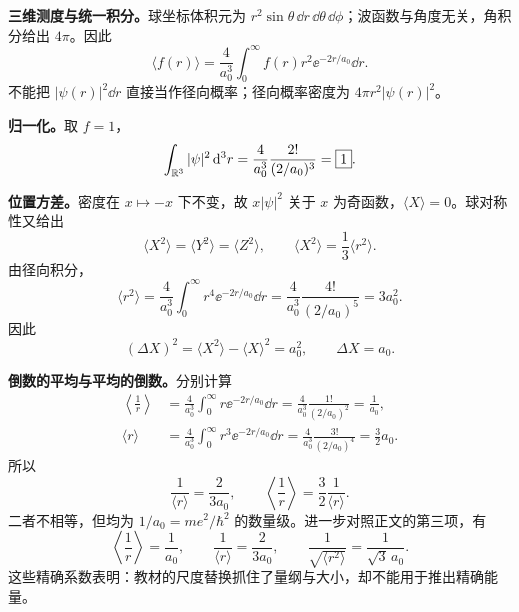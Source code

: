 \begin{checkedsolution}
\textbf{三维测度与统一积分。}球坐标体积元为 $r^2\sin\theta\,\dd r\,\dd\theta\,\dd\phi$；波函数与角度无关，角积分给出 $4\pi$。因此
\begin{equation}
  \langle f(r)\rangle=\frac4{a_0^3}\int_0^\infty
      f(r)r^2\ee^{-2r/a_0}\dd r.
\end{equation}
不能把 $|\psi(r)|^2\dd r$ 直接当作径向概率；径向概率密度为 $4\pi r^2|\psi(r)|^2$。

\textbf{归一化。}取 $f=1$，
\begin{equation}
  \int_{\mathbb{R}^3}|\psi|^2\mathop{}\!\mathrm{d}^3r
   =\frac4{a_0^3}\frac{2!}{(2/a_0)^3}=\boxed{1}.
\end{equation}

\textbf{位置方差。}密度在 $x\mapsto-x$ 下不变，故 $x|\psi|^2$ 关于 $x$ 为奇函数，$\langle X\rangle=0$。球对称性又给出
\begin{equation}
  \langle X^2\rangle=\langle Y^2\rangle=\langle Z^2\rangle,
  \qquad \langle X^2\rangle=\frac13\langle r^2\rangle.
\end{equation}
由径向积分，
\begin{equation}
  \langle r^2\rangle=\frac4{a_0^3}\int_0^\infty
     r^4\ee^{-2r/a_0}\dd r
   =\frac4{a_0^3}\frac{4!}{(2/a_0)^5}=3a_0^2.
\end{equation}
因此
\begin{equation}
  \boxed{(\Delta X)^2=\langle X^2\rangle-\langle X\rangle^2=a_0^2},
  \qquad \boxed{\Delta X=a_0}.
\end{equation}

\textbf{倒数的平均与平均的倒数。}分别计算
\begin{align}
  \left\langle\frac1r\right\rangle
    &=\frac4{a_0^3}\int_0^\infty r\ee^{-2r/a_0}\dd r
      =\frac4{a_0^3}\frac{1!}{(2/a_0)^2}=\frac1{a_0},\\
  \langle r\rangle
    &=\frac4{a_0^3}\int_0^\infty r^3\ee^{-2r/a_0}\dd r
      =\frac4{a_0^3}\frac{3!}{(2/a_0)^4}=\frac32a_0.
\end{align}
所以
\begin{equation}
  \boxed{\frac1{\langle r\rangle}=\frac2{3a_0}},\qquad
  \left\langle\frac1r\right\rangle=\frac32\frac1{\langle r\rangle}.
\end{equation}
二者不相等，但均为 $1/a_0=me^2/\hbar^2$ 的数量级。进一步对照正文的第三项，有
\begin{equation}
  \boxed{\left\langle\frac1r\right\rangle=\frac1{a_0},\qquad
    \frac1{\langle r\rangle}=\frac2{3a_0},\qquad
    \frac1{\sqrt{\langle r^2\rangle}}=\frac1{\sqrt3\,a_0}}.
\end{equation}
这些精确系数表明：教材的尺度替换抓住了量纲与大小，却不能用于推出精确能量。
\end{checkedsolution}

